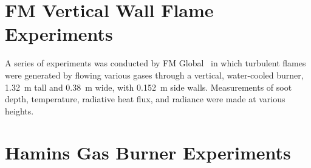 %
%
%

\section{FM Vertical Wall Flame Experiments}
\label{FM_Vertical_Wall_Flame_Description}

A series of experiments was conducted by FM Global~\cite{deRis:IAFSS} in which turbulent flames were generated by flowing various gases through a vertical, water-cooled burner, 1.32~m tall and 0.38~m wide, with 0.152~m side walls. Measurements of soot depth, temperature, radiative heat flux, and radiance were made at various heights.


\section{Hamins Gas Burner Experiments}
\label{Hamins_Gas_Burner_Description}

